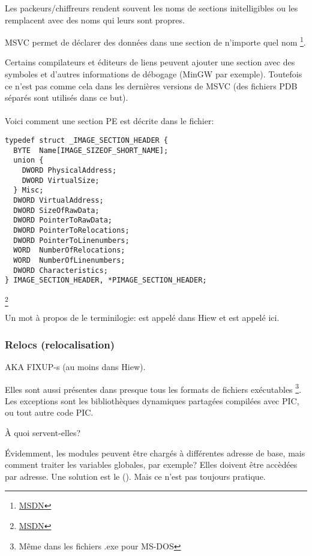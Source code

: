 Les packeurs/chiffreurs rendent souvent les noms de sections initelligibles ou les
remplacent avec des noms qui leurs sont propres.

\ac{MSVC} permet de déclarer des données dans une section de n'importe quel nom
\footnote{\href{http://go.yurichev.com/17047}{MSDN}}.

Certains compilateurs et éditeurs de liens peuvent ajouter une section avec des symboles
et d'autres informations de débogage (MinGW par exemple).
Toutefois ce n'est pas comme cela dans les dernières versions de \ac{MSVC} (des fichiers
\gls{PDB} séparés sont utilisés dans ce but).\\
\\
Voici comment une section PE est décrite dans le fichier:

\begin{lstlisting}
typedef struct _IMAGE_SECTION_HEADER {
  BYTE  Name[IMAGE_SIZEOF_SHORT_NAME];
  union {
    DWORD PhysicalAddress;
    DWORD VirtualSize;
  } Misc;
  DWORD VirtualAddress;
  DWORD SizeOfRawData;
  DWORD PointerToRawData;
  DWORD PointerToRelocations;
  DWORD PointerToLinenumbers;
  WORD  NumberOfRelocations;
  WORD  NumberOfLinenumbers;
  DWORD Characteristics;
} IMAGE_SECTION_HEADER, *PIMAGE_SECTION_HEADER;
\end{lstlisting}
\footnote{\href{http://go.yurichev.com/17048}{MSDN}}

Un mot à propos de le terminilogie:  est appelé  dans
Hiew et  est appelé  ici.

\subsubsection{Relocs (relocalisation)}
\label{subsec:relocs}

\ac{AKA} FIXUP-s (au moins dans Hiew).

Elles sont aussi présentes dans presque tous les formats de fichiers exécutables
\footnote{Même dans les fichiers .exe pour MS-DOS}.
Les exceptions sont les bibliothèques dynamiques partagées compilées avec \ac{PIC},
ou tout autre code \ac{PIC}.

À quoi servent-elles?

Évidemment, les modules peuvent être chargés à différentes adresse de base, mais
comment traiter les variables globales, par exemple? Elles doivent être accèdées
par adresse. Une solution est le \PICcode{} ().
Mais ce n'est pas toujours pratique.

